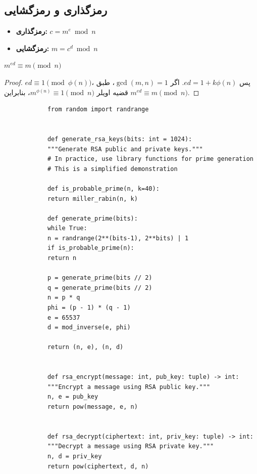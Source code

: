 \documentclass{matinbook}
\begin{document}
    \subsection{رمزگذاری و رمزگشایی}
    
    \begin{itemize}
        \item \textbf{رمزگذاری:}
        $c = m^{e} \bmod n$
        \item \textbf{رمزگشایی:}
        $m = c^{d} \bmod n$
    \end{itemize}
    
    \begin{theorem}
        $m^{ed} \equiv m \pmod{n}$
        \label{thm:rsa-correctness}
    \end{theorem}
    
    \begin{proof}
        $ed \equiv 1 \pmod{\phi(n)}$،
        پس $ed = 1 + k\phi(n)$.
        اگر $\gcd(m, n) = 1$،
        طبق قضیه اویلر
        $m^{\phi(n)} \equiv 1 \pmod{n}$،
        بنابراین $m^{ed} \equiv m \pmod{n}$.
    \end{proof}
    
    \begin{latin}
        \begin{verbatim}
            from random import randrange
            
            
            def generate_rsa_keys(bits: int = 1024):
            """Generate RSA public and private keys."""
            # In practice, use library functions for prime generation
            # This is a simplified demonstration
            
            def is_probable_prime(n, k=40):
            return miller_rabin(n, k)
            
            def generate_prime(bits):
            while True:
            n = randrange(2**(bits-1), 2**bits) | 1
            if is_probable_prime(n):
            return n
            
            p = generate_prime(bits // 2)
            q = generate_prime(bits // 2)
            n = p * q
            phi = (p - 1) * (q - 1)
            e = 65537
            d = mod_inverse(e, phi)
            
            return (n, e), (n, d)
            
            
            def rsa_encrypt(message: int, pub_key: tuple) -> int:
            """Encrypt a message using RSA public key."""
            n, e = pub_key
            return pow(message, e, n)
            
            
            def rsa_decrypt(ciphertext: int, priv_key: tuple) -> int:
            """Decrypt a message using RSA private key."""
            n, d = priv_key
            return pow(ciphertext, d, n)
        \end{verbatim}
    \end{latin}
    \label{code:rsa}
    
\end{document}
